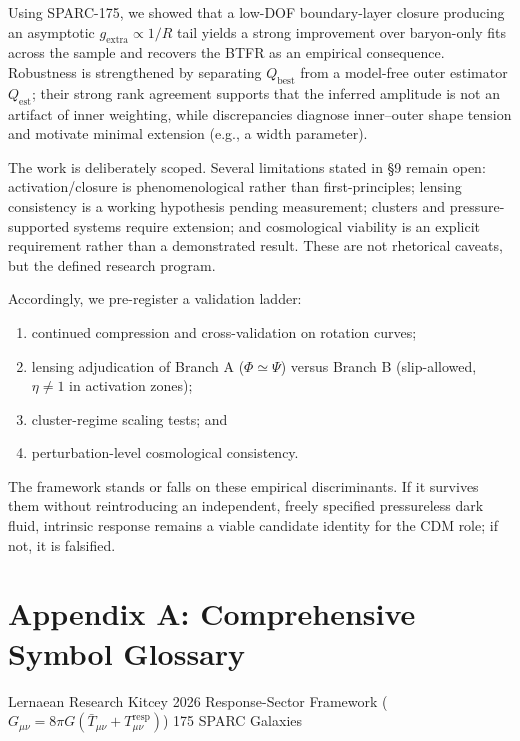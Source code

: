 \documentclass[11pt]{article}
\begin{document}
Using SPARC-175, we showed that a low-DOF boundary-layer closure producing an asymptotic \(g_{\text{extra}} \propto 1\text{/}R\) tail yields a strong improvement over baryon-only fits across the sample and recovers the BTFR as an empirical consequence. Robustness is strengthened by separating \(Q_{\text{best}}\) from a model-free outer estimator \(Q_{\text{est}}\); their strong rank agreement supports that the inferred amplitude is not an artifact of inner weighting, while discrepancies diagnose inner--outer shape tension and motivate minimal extension (e.g., a width parameter).

The work is deliberately scoped. Several limitations stated in §9 remain open: activation/closure is phenomenological rather than first-principles; lensing consistency is a working hypothesis pending measurement; clusters and pressure-supported systems require extension; and cosmological viability is an explicit requirement rather than a demonstrated result. These are not rhetorical caveats, but the defined research program.

Accordingly, we pre-register a validation ladder:

\begin{enumerate}
\def\labelenumi{(\roman{enumi})}
\item
  continued compression and cross-validation on rotation curves;
\item
  lensing adjudication of Branch A (\(\Phi \simeq \Psi\)) versus Branch B (slip-allowed, \(\eta \neq 1\) in activation zones);
\item
  cluster-regime scaling tests; and
\item
  perturbation-level cosmological consistency.
\end{enumerate}

\noindent The framework stands or falls on these empirical discriminants. If it survives them without reintroducing an independent, freely specified pressureless dark fluid, intrinsic response remains a viable candidate identity for the CDM role; if not, it is falsified.

\section{Appendix A: Comprehensive Symbol Glossary}\label{appendix-a-comprehensive-symbol-glossary}

Lernaean Research\texttrademark{} \textbar{} Kitcey 2026 \textbar{} Response-Sector Framework ($G_{\mu\nu} = 8\pi G (\bar{T}_{\mu\nu} + T^{\text{resp}}_{\mu\nu})$) \textbar{} 175 SPARC Galaxies
\end{document}
